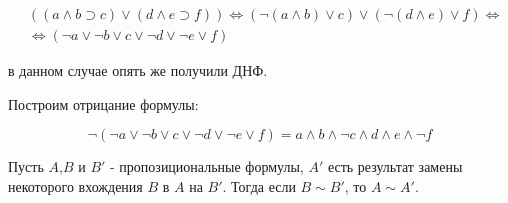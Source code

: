 \documentclass[a4paper,12pt]{article}
\begin{document}
\begin{Solution}
\[
	\begin{split}
        	& \left(\left(a \wedge b \supset c\right) \vee \left(d \wedge e \supset f\right)\right) \Leftrightarrow \left(\neg \left(a \wedge b\right) \vee c\right) \vee \left(\neg \left(d \wedge e\right) \vee f\right) \Leftrightarrow \\
		& \Leftrightarrow \left(\neg a \vee \neg b \vee c \vee \neg d \vee \neg e \vee f\right)
	\end{split}
\]

в данном случае опять же получили ДНФ.

Построим отрицание формулы:

\[
	\neg \left(\neg a \vee \neg b \vee c \vee \neg d \vee \neg e \vee f\right) = a \wedge b \wedge \neg c \wedge d \wedge e \wedge \neg f
\]

\end{Solution}

\begin{Th}
Пусть $A$,$B$ и $B'$ - пропозициональные формулы, $A'$ есть результат замены некоторого вхождения $B$ в $A$ на $B'$. Тогда если $B \sim B'$, то $A \sim A'$.
\end{Th}
\end{document}
